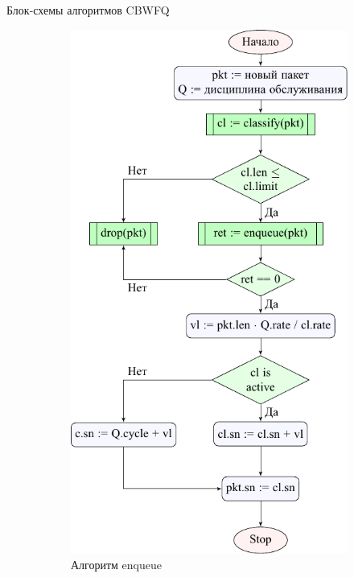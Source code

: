 \documentclass[12pt]{beamer}
\begin{document}
\begin{frame}{Блок-схемы алгоритмов CBWFQ}
	\begin{figure}[t]
		\begin{subfigure}[b]{0.4\textwidth}
            \center
            \includegraphics[scale=0.45,frame]{../text/pdfimages/enq_algo.pdf}%
    		\caption*{Алгоритм enqueue}
		\end{subfigure}
~~~~~~~~
		\begin{subfigure}[b]{0.4\textwidth}

\end{subfigure}
\end{figure}
\end{frame}
\end{document}
